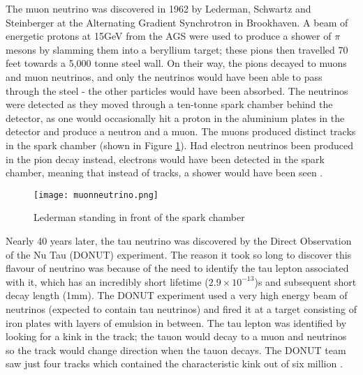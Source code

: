 \documentclass[11pt,oneside,a4paper]{article}
\begin{document}
The muon neutrino was discovered in 1962 by Lederman, Schwartz and Steinberger at the Alternating Gradient Synchrotron in Brookhaven. A beam of energetic protons at 15GeV from the AGS were used to produce a shower of $\pi$ mesons by slamming them into a beryllium target; these pions then travelled 70 feet towards a 5,000 tonne steel wall. On their way, the pions decayed to muons and muon neutrinos, and only the neutrinos would have been able to pass through the steel - the other particles would have been absorbed. The neutrinos were detected as they moved through a ten-tonne spark chamber behind the detector, as one would occasionally hit a proton in the aluminium plates in the detector and produce a neutron and a muon. The muons produced distinct tracks in the spark chamber (shown in Figure \ref{fig:muonneutrino}). Had electron neutrinos been produced in the pion decay instead, electrons would have been detected in the spark chamber, meaning that instead of tracks, a shower would have been seen \cite{muonneutrino}.

\begin{figure}[htbp]
	\centering
	\texttt{[image: muonneutrino.png]}
	\caption{Lederman standing in front of the spark chamber}
	\label{fig:muonneutrino}
\end{figure}

Nearly 40 years later, the tau neutrino was discovered by the Direct Observation of the Nu Tau (DONUT) experiment. The reason it took so long to discover this flavour of neutrino was because of the need to identify the tau lepton associated with it, which has an incredibly short lifetime ($2.9 \times 10^{-13}$)s and subsequent short decay length (1mm). The DONUT experiment used a very high energy beam of neutrinos (expected to contain tau neutrinos) and fired it at a target consisting of iron plates with layers of emulsion in between. The tau lepton was identified by looking for a kink in the track; the tauon would decay to a muon and neutrinos so the track would change direction when the tauon decays. The DONUT team saw just four tracks which contained the characteristic kink out of six million \cite{tauneutrino}.
\end{document}
